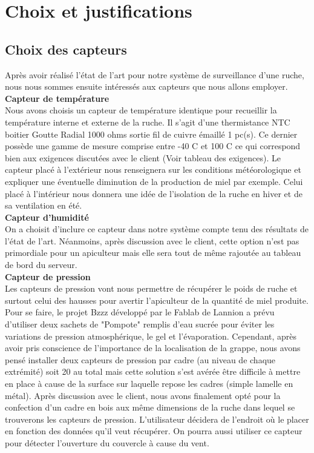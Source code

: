 

\chapter{Choix et justifications}

\section{Choix des capteurs}
\vspace{1.5cm}
Après avoir réalisé l'état de l'art pour notre système de surveillance d'une ruche, nous nous sommes ensuite intéressés aux capteurs que nous allons employer.\\

\textbf{Capteur de température}\\

Nous avons choisis un capteur de température identique pour recueillir la température interne et externe de la ruche.
Il s'agit d'une thermistance NTC boitier Goutte Radial 1000 ohms sortie fil de cuivre émaillé 1 pc(s). Ce dernier possède une gamme de mesure comprise entre -40 C et 100 C ce qui correspond bien aux exigences discutées avec le client (Voir tableau des exigences). Le capteur placé à l'extérieur nous renseignera sur les conditions météorologique et expliquer une éventuelle diminution de la production de miel par exemple. Celui placé à l'intérieur nous donnera une idée de l'isolation de la ruche en hiver et de sa ventilation en été.\\  

\textbf{Capteur d'humidité}\\

On a choisit d'inclure ce capteur dans notre système compte tenu des résultats de l'état de l'art. Néanmoins, après discussion avec le client, cette option n'est pas primordiale pour un apiculteur mais elle sera tout de même rajoutée au tableau de bord du serveur.\\

\textbf{Capteur de pression}\\

Les capteurs de pression vont nous permettre de récupérer le poids de ruche et surtout celui des hausses pour avertir l'apiculteur de la quantité de miel produite. Pour se faire, le projet Bzzz développé par le Fablab de Lannion a prévu d'utiliser deux sachets de "Pompote" remplis d'eau sucrée pour éviter les variations de pression atmosphérique, le gel et l'évaporation. Cependant, après avoir pris conscience de l'importance de la localisation de la grappe, nous avons pensé installer deux capteurs de pression par cadre (au niveau de chaque extrémité) soit 20 au total mais cette solution s'est avérée être difficile à mettre en place à cause de la surface sur laquelle repose les cadres (simple lamelle en métal). Après discussion avec le client, nous avons finalement opté pour la confection d'un cadre en bois aux même dimensions de la ruche dans lequel se trouverons les capteurs de pression. L'utilisateur décidera de l'endroit où le placer en fonction des données qu'il veut récupérer. 
On pourra aussi utiliser ce capteur pour détecter l'ouverture du couvercle à cause du vent.\\

